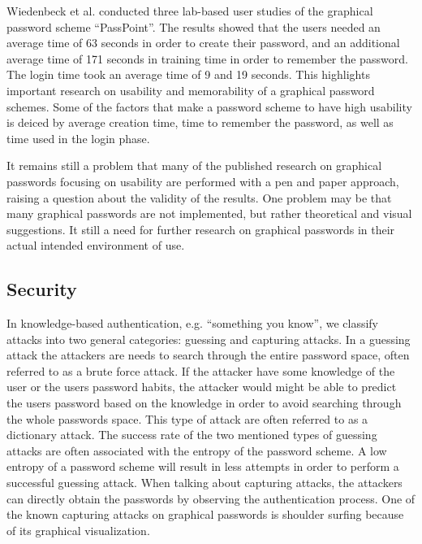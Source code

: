     Wiedenbeck et al. \cite{Wiedenbeck1, Wiedenbeck2, Wiedenbeck3} conducted three lab-based user studies of the graphical password scheme ``PassPoint''. The results showed that the users needed an average time of 63 seconds in order to create their password, and an additional average time of 171 seconds in training time in order to remember the password. The login time took an average time of 9 and 19 seconds. This highlights important research on usability and memorability of a graphical password schemes. Some of the factors that make a password scheme to have high usability is deiced by average creation time, time to remember the password, as well as time used in the login phase. 

    It remains still a problem that many of the published research on graphical passwords focusing on usability are performed with a pen and paper approach, raising a question about the validity of the results. One problem may be that many graphical passwords are not implemented, but rather theoretical and visual suggestions. It still a need for further research on graphical passwords in their actual intended environment of use.


	\subsection{Security} \label{sec:security}

    In knowledge-based authentication, e.g. ``something you know'', we classify attacks into two general categories: guessing and capturing attacks. 
    In a guessing attack the attackers are needs to search through the entire password space, often referred to as a brute force attack. If the attacker have some knowledge of the user or the users password habits, the attacker would might be able to predict the users password based on the knowledge in order to avoid searching through the whole passwords space. This type of attack are often referred to as a dictionary attack. The success rate of the two mentioned types of guessing attacks are often associated with the entropy of the password scheme. A low entropy of a password scheme will result in less attempts in order to perform a successful guessing attack. When talking about capturing attacks, the attackers can directly obtain the passwords by observing the authentication process. One of the known capturing attacks on graphical passwords is shoulder surfing because of its graphical visualization.

